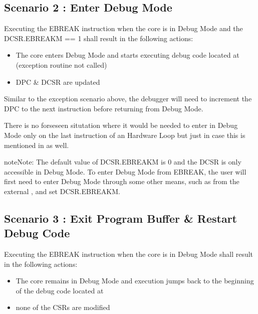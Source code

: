 \documentclass[letterpaper,10pt,english]{sphinxmanual}
\begin{document}
\subsection{Scenario 2 : Enter Debug Mode}
\label{\detokenize{debug:scenario-2-enter-debug-mode}}\label{\detokenize{debug:ebreak-scenario-2}}
\sphinxAtStartPar
Executing the EBREAK instruction when the core is  in Debug Mode and the DCSR.EBREAKM == 1 shall result in the following actions:
\begin{itemize}
\item {} 
\sphinxAtStartPar
The core enters Debug Mode and starts executing debug code located at  (exception routine not called)

\item {} 
\sphinxAtStartPar
DPC \& DCSR are updated

\end{itemize}

\sphinxAtStartPar
Similar to the exception scenario above, the debugger will need to increment the DPC to the next instruction before returning from Debug Mode.

\sphinxAtStartPar
There is no forseseen situtation where it would be needed to enter in Debug Mode only on the last instruction of an Hardware Loop but just in case this is mentioned in {\hyperref[\detokenize{corev_hw_loop:hwloop-exceptions-handlers}]{}} as well.

\begin{sphinxadmonition}{note}{Note:}
\sphinxAtStartPar
The default value of DCSR.EBREAKM is 0 and the DCSR is only accessible in Debug Mode. To enter Debug Mode from EBREAK,
the user will first need to enter Debug Mode through some other means, such as from the external , and set DCSR.EBREAKM.
\end{sphinxadmonition}


\subsection{Scenario 3 : Exit Program Buffer \& Restart Debug Code}
\label{\detokenize{debug:scenario-3-exit-program-buffer-restart-debug-code}}\label{\detokenize{debug:ebreak-scenario-3}}
\sphinxAtStartPar
Executing the EBREAK instruction when the core is in Debug Mode shall result in the following actions:
\begin{itemize}
\item {} 
\sphinxAtStartPar
The core remains in Debug Mode and execution jumps back to the beginning of the debug code located at 

\item {} 
\sphinxAtStartPar
none of the CSRs are modified

\end{itemize}
\end{document}
